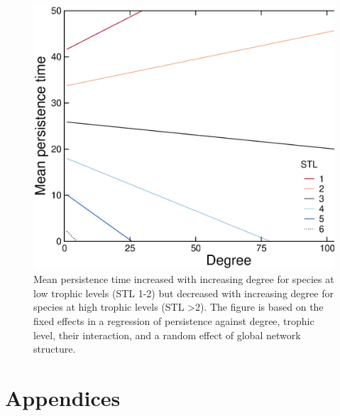 \documentclass[12pt]{article}
\begin{document}
    \begin{figure}[ht!]
        \centering
        \includegraphics[width=\textwidth]{figures/roles/persistence_vs_degTL.eps}
        \caption{Mean persistence time increased with increasing degree for species at low trophic levels (STL 1-2) but decreased with increasing degree for species at high trophic levels (STL \textgreater2). The figure is based on the fixed effects in a regression of persistence against degree, trophic level, their interaction, and a random effect of global network structure.}
        \label{fig:persistence_degTL}
    \end{figure}

\clearpage

\section*{Appendices}
\end{document}
